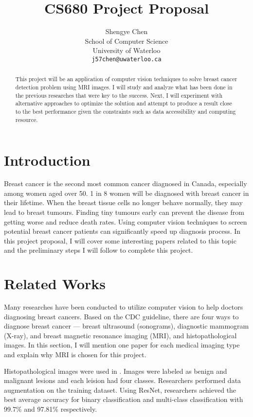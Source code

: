 \documentclass{article}
\title{CS680 Project Proposal}
\author{
	Shengye Chen \\
	School of Computer Science\\
	University of Waterloo\\
	\texttt{j57chen@uwaterloo.ca}
}
\begin{document}
\maketitle

\begin{abstract} 
This project will be an application of computer vision techniques to solve breast cancer detection problem using MRI images. I will study and analyze what has been done in the previous researches that were key to the success. Next, I will experiment with alternative approaches to optimize the solution and attempt to produce a result close to the best performance given the constraints such as data accessibility and computing resource.
\end{abstract} 

\section{Introduction}
Breast cancer is the second most common cancer diagnosed in Canada, especially among women aged over 50.\cite{cmaj191292} 1 in 8 women will be diagnosed with breast cancer in their lifetime. When the breast tissue cells no longer behave normally, they may lead to breast tumours. Finding tiny tumours early can prevent the disease from getting worse and reduce death rates. Using computer vision techniques to screen potential breast cancer patients can significantly speed up diagnosis process. In this project proposal, I will cover some interesting papers related to this topic and the preliminary steps I will follow to complete this project.

\section{Related Works}
Many researches have been conducted to utilize computer vision to help doctors diagnosing breast cancers. Based on the CDC guideline\cite{cdcdiagnosis}, there are four ways to diagnose breast cancer --- breast ultrasound (sonograms), diagnostic mammogram (X-ray), and breast magnetic resonance imaging (MRI), and  histopathological images. In this section, I will mention one paper for each medical imaging type and explain why MRI is chosen for this project.

Histopathological images were used in \cite{ALJUAID2022106951}. Images were labeled as benign and malignant lesions and each leision had four classes. Researchers performed data augmentation on the training dataset. Using ResNet, researchers achieved the best average accuracy for binary classification and multi-class classification with 99.7\% and 97.81\% respectively.
\end{document}
